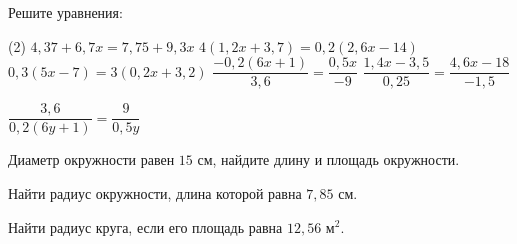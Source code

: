 \begin{homework}[number=4]
	\begin{listofex}
		\item Решите уравнения:
		\begin{tasks}(2)
			\task \( 4,37+6,7x=7,75+9,3x \)
			\task \( 4(1,2x+3,7)=0,2(2,6x-14) \)
			\task \( 0,3(5x-7)=3(0,2x+3,2) \)
			\task \( \dfrac{-0,2(6x+1)}{3,6}=\dfrac{0,5x}{-9} \)
			\task \( \dfrac{1,4x-3,5}{0,25}=\dfrac{4,6x-18}{-1,5} \)
			
			\task \( \dfrac{3,6}{0,2(6y+1)}=\dfrac{9}{0,5y} \)
			
			
			
		\end{tasks}
		\item Диаметр окружности равен \(15\) см, найдите длину и площадь окружности.
		\item Найти радиус окружности, длина которой равна \(7,85\) см.
		\item Найти радиус круга, если его площадь равна \(12,56\) м\(^2\).
	\end{listofex}
\end{homework}
